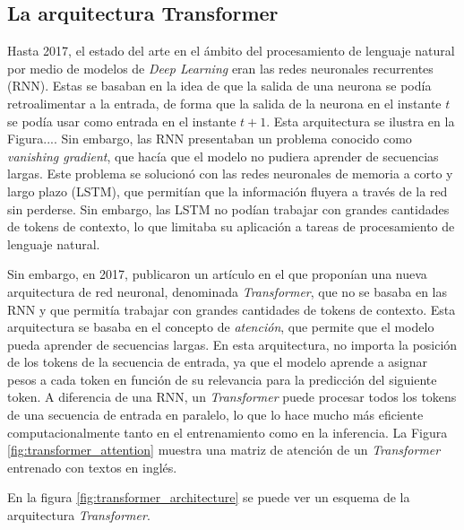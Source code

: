 \subsection{La arquitectura Transformer}
Hasta 2017, el estado del arte en el ámbito del procesamiento de lenguaje natural por medio de modelos de \textit{Deep Learning} eran las redes neuronales recurrentes (RNN). Estas se basaban en la idea de que la salida de una neurona se podía retroalimentar a la entrada, de forma que la salida de la neurona en el instante $t$ se podía usar como entrada en el instante $t+1$. Esta arquitectura se ilustra en la Figura.... Sin embargo, las RNN presentaban un problema conocido como \textit{vanishing gradient}, que hacía que el modelo no pudiera aprender de secuencias largas. Este problema se solucionó con las redes neuronales de memoria a corto y largo plazo (LSTM), que permitían que la información fluyera a través de la red sin perderse. Sin embargo, las LSTM no podían trabajar con grandes cantidades de tokens de contexto, lo que limitaba su aplicación a tareas de procesamiento de lenguaje natural.

Sin embargo, en 2017, \citeauthor{vaswaniAttentionAllYou2017} publicaron un artículo \citep{vaswaniAttentionAllYou2017} en el que proponían una nueva arquitectura de red neuronal, denominada \textit{Transformer}, que no se basaba en las RNN y que permitía trabajar con grandes cantidades de tokens de contexto. Esta arquitectura se basaba en el concepto de \textit{atención}, que permite que el modelo pueda aprender de secuencias largas. En esta arquitectura, no importa la posición de los tokens de la secuencia de entrada, ya que el modelo aprende a asignar pesos a cada token en función de su relevancia para la predicción del siguiente token. A diferencia de una RNN, un \textit{Transformer} puede procesar todos los tokens de una secuencia de entrada en paralelo, lo que lo hace mucho más eficiente computacionalmente tanto en el entrenamiento como en la inferencia. La Figura \ref{fig:transformer_attention} muestra una matriz de atención de un \textit{Transformer} entrenado con textos en inglés.

En la figura \ref{fig:transformer_architecture} se puede ver un esquema de la arquitectura \textit{Transformer}.

